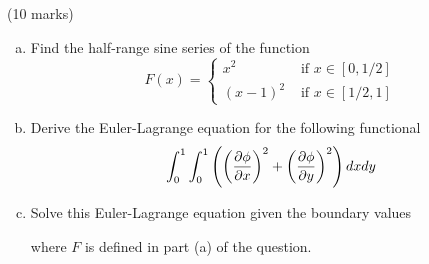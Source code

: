\documentclass[12pt]{article}
\begin{document}
\iffalse
\begin{answer}
The Euler-Lagrange equation for $\int_0^1\int_0^L(\frac{\rho}{2}(\partial_t\phi)^2-\frac{\tau}{2}(\partial_x\phi)^2)dxdt$ is
\[\frac{\rho}{2}\frac{\partial}{\partial t}\partial_t\phi-\frac{\tau}{2}\frac{\partial}{\partial x}\partial_x\phi=0\]
or
\[\frac{\rho}{\tau}\partial_t^2\phi=\partial_x^2\phi\]
which is the wave equation.
\end{answer}
\fi

\newpage

\begin{question}(10 marks)\\
\begin{enumerate}[(a)]
\item Find the half-range sine series of the function
\[F(x)=\begin{cases}
x^2&\mbox{ if }x\in[0,1/2]\\
(x-1)^2&\mbox{ if }x\in[1/2,1]
\end{cases}\]

\item Derive the Euler-Lagrange equation for the following functional
\[\int_0^1\int_0^1\left(\left(\dfrac{\partial \phi}{\partial x}\right)^2+\left(\dfrac{\partial \phi}{\partial y}\right)^2\right)dxdy\]

\item Solve this Euler-Lagrange equation given the boundary values

\begin{center}
\end{center}
where $F$ is defined in part (a) of the question.
\end{enumerate}
\end{question}
\end{document}
